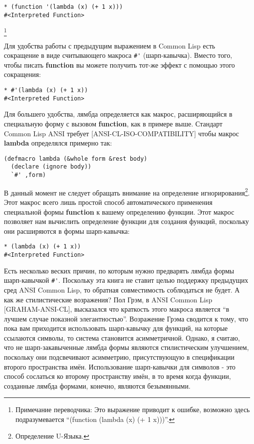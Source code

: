 \begin{verbatim}
* (function '(lambda (x) (+ 1 x)))
#<Interpreted Function>
\end{verbatim}

\footnote{Примечание переводчика: Это выражение приводит к ошибке, возможно здесь подразумевается ``(function (lambda (x) (+ 1 x)))''.}


Для удобства работы с предыдущим выражением в Common Lisp есть сокращение в виде считывающего макроса \verb"#'" (шарп-кавычка). Вместо того, чтобы писать \textbf{function} вы можете получить тот-же эффект с помощью этого сокращения:

\begin{verbatim}
* #'(lambda (x) (+ 1 x))
#<Interpreted Function>
\end{verbatim}

Для большего удобства, лямбда определяется как макрос, расширяющийся в специальную форму с вызовом \textbf{function}, как в примере выше. Стандарт Common Lisp ANSI требует [ANSI-CL-ISO-COMPATIBILITY] чтобы макрос \textbf{lambda} определялся примерно так:

\begin{verbatim}
(defmacro lambda (&whole form &rest body)
  (declare (ignore body))
  `#' ,form)
\end{verbatim}

В данный момент не следует обращать внимание на определение игнорирования\footnote{Определение U-Языка.}. Этот макрос всего лишь простой способ автоматического применения специальной формы \textbf{function} к вашему определению функции. Этот макрос позволяет нам вычислить определение функции для создания функций, поскольку они расширяются в формы шарп-кавычка:

\begin{verbatim}
* (lambda (x) (+ 1 x))
#<Interpreted Function>
\end{verbatim}

Есть несколько веских причин, по которым нужно предварять лямбда формы шарп-кавычкой \verb"#'". Поскольку эта книга не ставит целью поддержку предыдущих сред ANSI Common Lisp, то обратная совместимость соблюдаться не будет. А как же стилистические возражения? Пол Грэм, в ANSI Common Lisp [GRAHAM-ANSI-CL], высказался что краткость этого макроса является ``в лучшем случае показной элегантностью''. Возражение Грэма сводится к тому, что пока вам приходится использовать шарп-кавычку для функций, на которые ссылаются символы, то система становится асимметричной. Однако, я считаю, что не шарп-закавыченные лямбда формы являются стилистическим улучшением, поскольку они подсвечивают асимметрию, присутствующую в спецификации второго пространства имён. Использование шарп-кавычки для символов - это способ сослаться ко второму пространству имён, в то время когда функции, созданные лямбда формами, конечно, являются безымянными.

